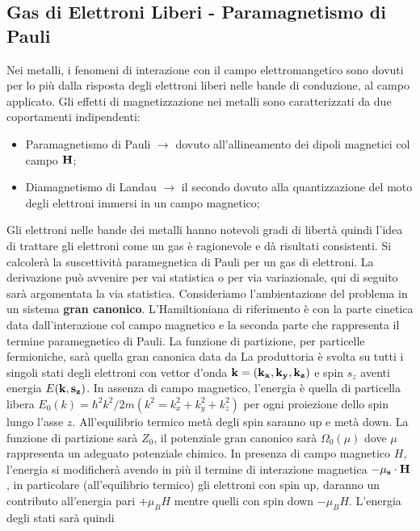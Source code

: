 \subsection{Gas di Elettroni Liberi - Paramagnetismo di Pauli}
Nei metalli, i fenomeni di interazione con il campo elettromangetico sono dovuti per lo più dalla risposta degli elettroni liberi nelle bande di conduzione, al campo applicato. Gli effetti di magnetizzazione nei metalli sono caratterizzati da due coportamenti indipendenti:
\begin{itemize}
	\item Paramagnetismo di Pauli $\to$ dovuto all'allineamento dei dipoli magnetici col campo $\it\bf{H}$;
	\item Diamagnetismo di Landau $\to$ il secondo dovuto alla quantizzazione del moto degli elettroni immersi in un campo magnetico;
\end{itemize}
Gli elettroni nelle bande dei metalli hanno notevoli gradi di libertà quindi l'idea di trattare gli elettroni come un gas è ragionevole e d\`a risultati consistenti. Si calcolerà la suscettività paramegnetica di Pauli per un gas di elettroni. La derivazione può avvenire per vai statistica o per via variazionale, qui di seguito sarà argomentata la via statistica. Consideriamo l'ambientazione del problema in un sistema \textbf{gran canonico}. L'Hamiltioniana di riferimento \`e 
con la parte cinetica data dall'interazione col campo magnetico e la seconda parte che rappresenta il termine paramegnetico di Pauli. La funzione di partizione, per particelle fermioniche, sarà quella gran canonica data da
La produttoria è svolta su tutti i singoli stati degli elettroni con vettor d'onda 
$\it\bf{k} = \left(k_x,k_y,k_z\right)$ e spin $s_z$ aventi energia $E(\it\bf{k} ,s_z)$.
In assenza di campo magnetico, l'energia \`e quella di particella libera $E_0(k) = \hbar^2k^2/2m (k^2=k_x^2+k_y^2+k_z^2)$ per ogni proiezione dello spin lungo l'asse $z$. All'equilibrio termico met\`a degli spin saranno up e met\`a down. La funzione di partizione sar\`a $Z_0$, il potenziale gran canonico sar\`a $\Omega_0(\mu)$ dove $\mu$ rappresenta un adeguato potenziale chimico.
In presenza di campo magnetico $H$, l'energia si modificher\`a avendo in pi\`u il termine di interazione magnetica $-{\it\bf \mu_s} \cdot {\it\bf H} $, in particolare (all'equilibrio termico) gli elettroni con spin up, daranno un contributo all'energia pari $+\mu_BH$ mentre quelli con spin down $-\mu_BH$. L'energia degli stati sar\`a quindi 
